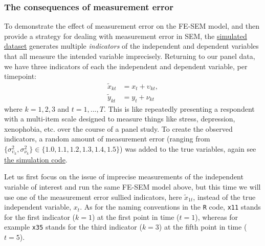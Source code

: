 \documentclass[]{interact}
\theoremstyle{plain}%
\theoremstyle{definition}
\theoremstyle{remark}
\begin{document}
\hypertarget{the-consequences-of-measurement-error}{%
\subsubsection{The consequences of measurement
error}\label{the-consequences-of-measurement-error}}

To demonstrate the effect of measurement error on the FE-SEM model, and
then provide a strategy for dealing with measurement error in SEM, the
\href{https://github.com/henrik-andersen/FE-SEM/blob/master/simulation-code.R}{simulated
dataset} generates multiple \emph{indicators} of the independent and
dependent variables that all measure the intended variable imprecisely.
Returning to our panel data, we have three indicators of each the
independent and dependent variable, per timepoint:\\
\begin{align}
\tilde{x}_{kt} & = x_{t} + \upsilon_{kt}, \\
\tilde{y}_{kt} & = y_{t} + \nu_{kt}
\end{align} where \(k = 1, 2, 3\) and \(t = 1, ..., T\). This is like
repeatedly presenting a respondent with a multi-item scale designed to
measure things like stress, depression, xenophobia, etc. over the course
of a panel study. To create the observed indicators, a random amount of
measurement error (ranging from
\(\{\sigma^{2}_{\upsilon_{k}}, \sigma^{2}_{\nu_{k}}\}\in \{1.0, 1.1, 1.2, 1.3, 1.4, 1.5\}\))
was added to the true variables, again see
\href{https://github.com/henrik-andersen/FE-SEM/blob/master/simulation-code.R}{the
simulation code}.

Let us first focus on the issue of imprecise measurements of the
independent variable of interest and run the same FE-SEM model above,
but this time we will use one of the measurement error sullied
indicators, here \(\tilde{x}_{1t}\), instead of the true independent
variable, \(x_{t}\). As for the naming conventions in the \texttt{R}
code, \texttt{x11} stands for the first indicator (\(k = 1\)) at the
first point in time (\(t = 1\)), whereas for example \texttt{x35} stands
for the third indicator (\(k = 3\)) at the fifth point in time
(\(t = 5\)).

\singlespacing
\end{document}
